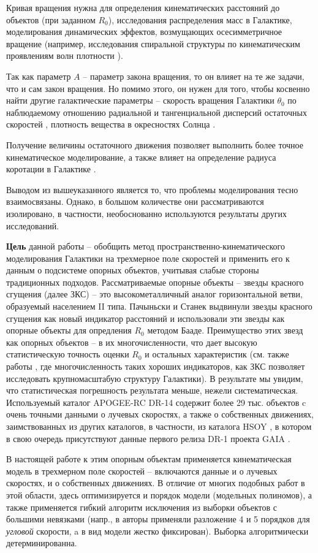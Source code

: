 \documentclass{matmex-diploma-custom}
\begin{document}
\par Кривая вращения нужна для определения кинематических расстояний до объектов (при заданном $R_0$), исследования распределения масс в Галактике, моделирования динамических эффектов, возмущающих осесимметричное вращение (например, исследования спиральной структуры по кинематическим проявлениям волн плотности \cite{Sitnik,Mishurov,NIISch}).
\par Так как параметр $A$ -- параметр закона вращения, то он влияет на те же задачи, что и сам закон вращения. Но помимо этого, он нужен для того, чтобы косвенно найти другие галактические параметры -- скорость вращения Галактики $\theta_0$ по наблюдаемому отношению радиальной и тангенциальной дисперсий остаточных скоростей \cite{Rohlfs}, плотность вещества в окресностях Солнца \cite{Lynden-Bell}. 
\par Получение величины остаточного движения позволяет выполнить более точное кинематическое моделирование, а также влияет на определение радиуса коротации в Галактике \cite{Fridman}.
\par Выводом из вышеуказанного является то, что проблемы моделирования тесно взаимосвязаны. Однако, в большом количестве они рассматриваются изолировано, в частности, необоснованно используются результаты других исследований. 
\par \textbf{Цель} данной работы -- обобщить метод \cite{NIIm} пространственно-кинематического моделирования Галактики на трехмерное поле скоростей и применить его к данным о подсистеме опорных объектов, учитывая слабые стороны традиционных подходов. Рассматриваемые опорные объекты -- звезды красного сгущения (далее ЗКС) -- это высокометалличный аналог горизонтальной ветви, образуемый населением II типа. Пачыньски и Станек \cite{Paczynski, Stanek} выдвинули звезды красного сгущения как новый индикатор расстояний и использовали эти звезды как опорные объекты для опредления $R_0$ методом Бааде. Преимущество этих звезд как опорных объектов -- в их многочисленности, что дает высокую статистическую точность оценки $R_0$ и остальных характеристик (см. также работы \cite{Wegg, Yang, Shourya}, где многочисленность таких хороших индикаторов, как ЗКС позволяет исследовать крупномасштабую структуру Галактики). В результате мы увидим, что статистическая погрешность результата меньше, нежели систематическая. Используемый каталог APOGEE-RC DR-14 \cite{DRdecs} содержит более 29 тыс. объектов c очень точными данными о лучевых скоростях, а также о собственных движениях, заимствованных из других каталогов, в частности, из каталога HSOY \cite{HSOY}, в котором в свою очередь присутствуют данные первого релиза DR-1 проекта GAIA \cite{GAIA}. \par В настоящей работе к этим опорным объектам применяется кинематическая модель \cite{NIIm} в трехмерном поле скоростей -- включаются данные и о лучевых скоростях, и о собственных движениях. В отличие от многих подобных работ в этой области, здесь оптимизируется и порядок модели (модельных полиномов), а также применяется гибкий алгоритм \cite{NIIE} исключения из выборки объектов с большими невязками (напр., в \cite{Rastorguev} авторы применяли разложение 4 и 5 порядков для \textit{угловой} скорости, a в \cite{Baikbob} вид модели жестко фиксирован). Выборка алгоритмически детерминированна.
\end{document}
